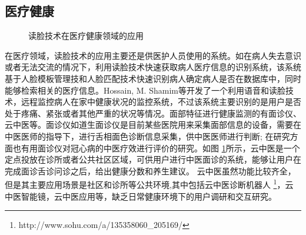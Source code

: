 \subsection{医疗健康}
\begin{figure}[h]
    \centering
    \caption{读脸技术在医疗健康领域的应用}
    \label{fig:med}
\end{figure}
在医疗领域，读脸技术的应用主要还是供医护人员使用的系统。如在病人失去意识或者无法交流的情况下，利用读脸技术快速获取病人医疗信息的识别系统\cite{nwosu2016mobile}，该系统基于人脸模板管理技和人脸匹配技术快速识别病人确定病人是否在数据库中，同时能够检索相关的医疗信息。Hossain, M. Shamim等\cite{Hossain2015Cloud}开发了一个利用语音和读脸技术，远程监控病人在家中健康状况的监控系统，不过该系统主要识别的是用户是否处于疼痛、紧张或者其他严重的状况等情况。面部特征进行健康监测的有面诊仪、云中医\cite{Zhang2018Study}等。面诊仪如道生面诊仪\cite{邸丹2016手持式舌象仪的研制}是目前某些医院用来采集面部信息的设备，需要在中医医师的指导下，进行舌相面色诊断信息采集，供中医医师进行判断; 在研究方面也有用面诊仪对冠心病的中医疗效进行评价的研究。如图 \ref{fig:med}所示，云中医是一个定点投放在诊所或者公共社区区域，可供用户进行中医面诊的系统，能够让用户在完成面诊舌诊问诊之后，给出健康分数和养生建议。
云中医虽然功能比较齐全，但是其主要应用场景是社区和诊所等公共环境,其中包括云中医诊断机器人 \footnote{http://www.sohu.com/a/135358060\_205169/}，云中医智能镜\cite{李雪2016}，云中医应用\cite{钱鹏基于云中医的健康监测方法及系统}等，缺乏日常健康环境下的用户调研和交互研究。

